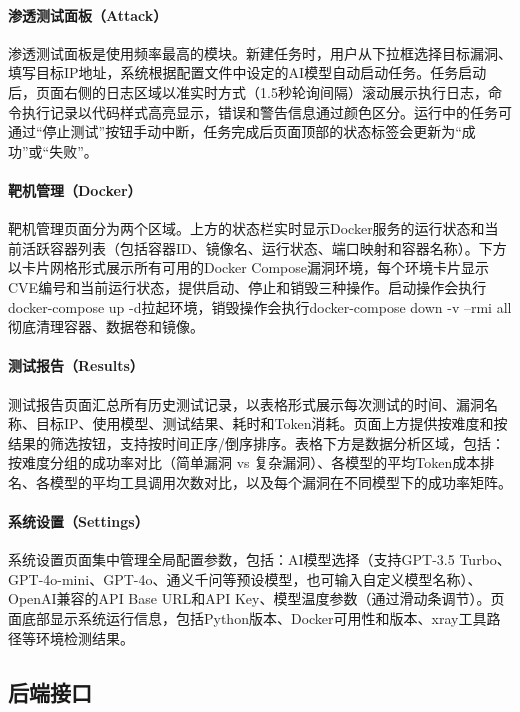 \paragraph{渗透测试面板（Attack）}

渗透测试面板是使用频率最高的模块。新建任务时，用户从下拉框选择目标漏洞、填写目标IP地址，系统根据配置文件中设定的AI模型自动启动任务。任务启动后，页面右侧的日志区域以准实时方式（1.5秒轮询间隔）滚动展示执行日志，命令执行记录以代码样式高亮显示，错误和警告信息通过颜色区分。运行中的任务可通过“停止测试”按钮手动中断，任务完成后页面顶部的状态标签会更新为“成功”或“失败”。

\paragraph{靶机管理（Docker）}

靶机管理页面分为两个区域。上方的状态栏实时显示Docker服务的运行状态和当前活跃容器列表（包括容器ID、镜像名、运行状态、端口映射和容器名称）。下方以卡片网格形式展示所有可用的Docker Compose漏洞环境，每个环境卡片显示CVE编号和当前运行状态，提供启动、停止和销毁三种操作。启动操作会执行docker-compose up -d拉起环境，销毁操作会执行docker-compose down -v --rmi all彻底清理容器、数据卷和镜像。

\paragraph{测试报告（Results）}

测试报告页面汇总所有历史测试记录，以表格形式展示每次测试的时间、漏洞名称、目标IP、使用模型、测试结果、耗时和Token消耗。页面上方提供按难度和按结果的筛选按钮，支持按时间正序/倒序排序。表格下方是数据分析区域，包括：按难度分组的成功率对比（简单漏洞 vs 复杂漏洞）、各模型的平均Token成本排名、各模型的平均工具调用次数对比，以及每个漏洞在不同模型下的成功率矩阵。

\paragraph{系统设置（Settings）}

系统设置页面集中管理全局配置参数，包括：AI模型选择（支持GPT-3.5 Turbo、GPT-4o-mini、GPT-4o、通义千问等预设模型，也可输入自定义模型名称）、OpenAI兼容的API Base URL和API Key、模型温度参数（通过滑动条调节）。页面底部显示系统运行信息，包括Python版本、Docker可用性和版本、xray工具路径等环境检测结果。

\subsection{后端接口}

